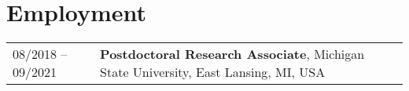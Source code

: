 \section*{Employment}
\begin{tabular}{p{} p{}}
08/2018 -- 09/2021 & \textbf{Postdoctoral Research Associate},
		              Michigan State University, East Lansing, MI, USA \\
\end{tabular}
